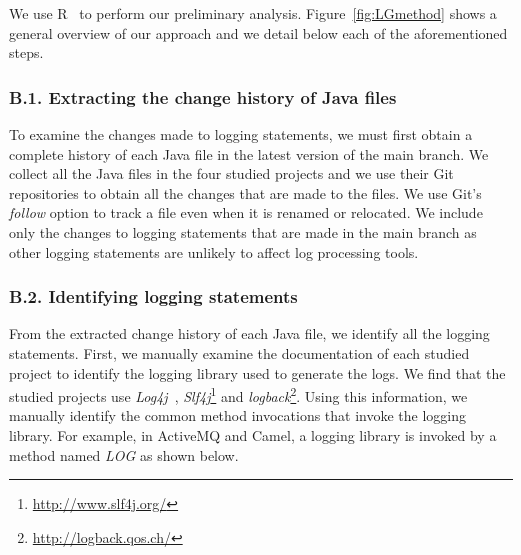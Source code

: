 We use R~\cite{ihaka1996r} to perform our preliminary analysis. Figure~\ref{fig:LGmethod} shows a general overview of our approach and we detail below each of the aforementioned steps. 

\subsubsection*{B.1. Extracting the change history of Java files} 
To examine the changes made to logging statements, we must first obtain a complete history of each Java file in the latest version of the main branch.
We collect all the Java files in the four studied projects and we use their Git repositories to obtain all the changes that are made to the files. We use Git's \emph{follow} option to track a file even when it is renamed or relocated. We include only the changes to logging statements that are made in the main branch as other logging statements are unlikely to affect log processing tools. %

\subsubsection*{B.2. Identifying logging statements}
From the extracted change history of each Java file, we identify all the logging statements.
First, we manually examine the documentation of each studied project to identify the logging library used to generate the logs. %
We find that the studied projects use \textsl{Log4j}~\cite{EMSEIAN}, \emph{Slf4j}\footnote{\url{http://www.slf4j.org/}} and \emph{logback}\footnote{\url{http://logback.qos.ch/}}.
Using this information, we manually identify the common method invocations that invoke the logging library. For example, in ActiveMQ and Camel, a logging library is invoked by a method named \emph{LOG} as shown below.


